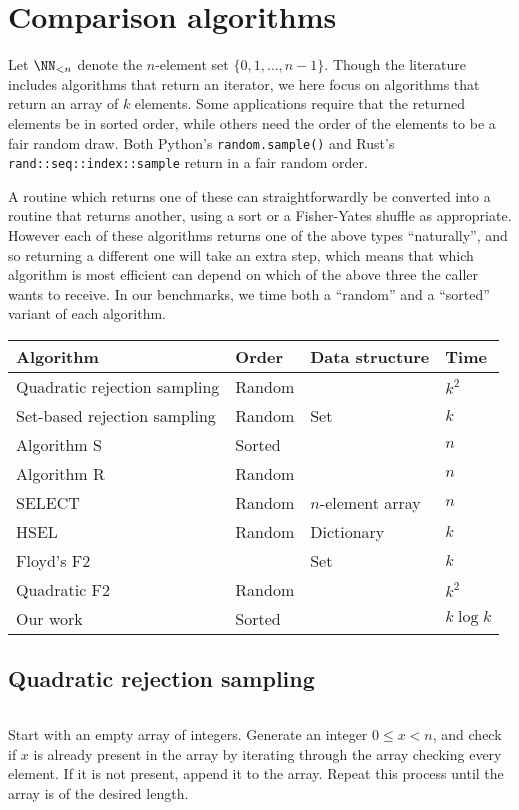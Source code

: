 \documentclass[letterpaper,luatex,11pt]{article}
\begin{document}
\inputminted{Python}{code/cardchoose.py}

\section{Comparison algorithms}\label{otheralgs}
Let \(\NN_{<n}\) denote the \(n\)-element set \(\{0, 1, \ldots,
n-1\}\). Though the literature includes algorithms that return an
iterator, we here focus on algorithms that return an array of \(k\)
elements. Some applications require that the returned elements be in
sorted order, while others need the order of the elements to be a fair
random draw. Both Python's \texttt{random.sample()} and
Rust's \texttt{rand::seq::index::sample} return in a fair
random order.

A routine which returns one of these can straightforwardly be
converted into a routine that returns another, using a sort or a
Fisher-Yates shuffle as appropriate. However each of these algorithms
returns one of the above types ``naturally'', and so returning a
different one will take an extra step, which means that which
algorithm is most efficient can depend on which of the above three the
caller wants to receive. In our benchmarks, we time both a ``random''
and a ``sorted'' variant of each algorithm.

\begin{center}
    \begin{tabular}{l|l|l|l}
    Algorithm & Order & Data structure & Time \\
    \hline
    Quadratic rejection sampling & Random &  & \(k^2\) \\
    Set-based rejection sampling & Random & Set & \(k\) \\
    Algorithm S & Sorted &  & \(n\) \\
    Algorithm R & Random &  & \(n\) \\
    SELECT & Random & \(n\)-element array & \(n\) \\
    HSEL & Random & Dictionary & \(k\) \\
    Floyd's F2 &  & Set & \(k\) \\
    Quadratic F2 & Random & & \(k^2\) \\
    Our work & Sorted &  & \(k \log k\)
    \end{tabular}
\end{center}

\subsection{Quadratic rejection sampling}
\inputminted{Python}{code/quadraticreject.py}
Start with an empty array of integers. Generate an integer \(0 \leq x
< n\), and check if \(x\) is already present in the array by iterating
through the array checking every element. If it is not present, append
it to the array. Repeat this process until the array is of the desired
length.
\end{document}
